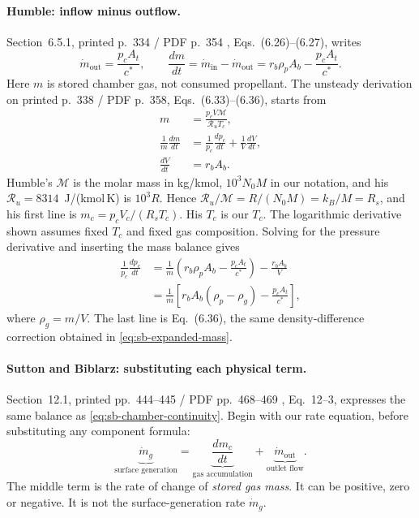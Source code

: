 \paragraph{Humble: inflow minus outflow.}
Section~6.5.1, printed p.~334 / PDF p.~354 \cite{humble},
Eqs.~(6.26)--(6.27), writes
\[
 \dot m_{\mathrm{out}}=\frac{p_c A_t}{c^*},\qquad
 \frac{dm}{dt}
 =\dot m_{\mathrm{in}}-\dot m_{\mathrm{out}}
 =r_b\rho_p A_b-\frac{p_c A_t}{c^*}.
\]
Here $m$ is stored chamber gas, not consumed propellant.
The unsteady derivation on printed p.~338 / PDF p.~358,
Eqs.~(6.33)--(6.36), starts from
\begin{align*}
 m&=\frac{p_c V\mathcal M}{\mathcal R_uT_c},\\
 \frac1m\frac{dm}{dt}
 &=\frac1{p_c}\frac{dp_c}{dt}+\frac1V\frac{dV}{dt},\\
 \frac{dV}{dt}&=r_bA_b.
\end{align*}
Humble's $\mathcal M$ is the molar mass in kg/kmol, $10^3N_0M$ in our
notation, and his $\mathcal R_u=8314$~J/(kmol\,K) is $10^3R$. Hence
$\mathcal R_u/\mathcal M=R/(N_0M)=k_B/M=R_s$, and his first line is
$m_c=p_cV_c/(R_sT_c)$. His $T_c$ is our $T_c$. The logarithmic
derivative shown assumes fixed $T_c$ and fixed gas composition.
Solving for the pressure derivative and inserting the mass balance gives
\begin{align*}
 \frac1{p_c}\frac{dp_c}{dt}
 &=\frac1m\left(r_b\rho_p A_b-\frac{p_cA_t}{c^*}\right)
   -\frac{r_bA_b}{V}\\
 &=\frac1m\left[r_bA_b(\rho_p-\rho_g)
                  -\frac{p_cA_t}{c^*}\right],
\end{align*}
where $\rho_g=m/V$. The last line is Eq.~(6.36), the same
density-difference correction obtained in \eqref{eq:sb-expanded-mass}.

\paragraph{Sutton and Biblarz: substituting each physical term.}
Section~12.1, printed pp.~444--445 / PDF pp.~468--469
\cite{sutton}, Eq.~12--3, expresses the same balance as
\eqref{eq:sb-chamber-continuity}. Begin with our rate equation, before
substituting any component formula:
\begin{equation}\label{eq:sb-sutton-start}
 \underbrace{\dot m_g}_{\text{surface generation}}
 =\underbrace{\frac{dm_c}{dt}}_{\text{gas accumulation}}
  +\underbrace{\dot m_{\mathrm{out}}}_{\text{outlet flow}}.
\end{equation}
The middle term is the rate of change of \emph{stored gas mass}.
It can be positive, zero or negative. It is not the surface-generation
rate $\dot m_g$.

